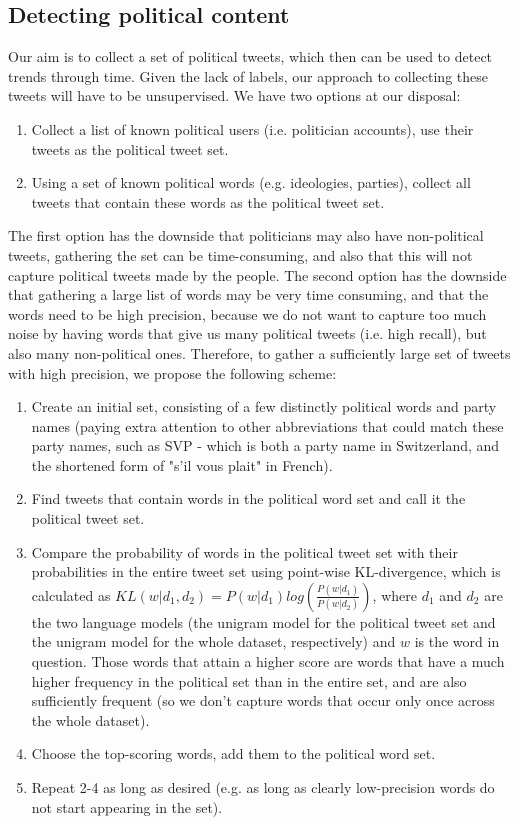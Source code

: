\subsection{Detecting political content}

Our aim is to collect a set of political tweets, which then can be used to detect trends through time. Given the lack of labels, our approach to collecting these tweets will have to be unsupervised. We have two options at our disposal:
\begin{enumerate}
  \item Collect a list of known political users (i.e. politician accounts), use their tweets as the political tweet set.
  \item Using a set of known political words (e.g. ideologies, parties), collect all tweets that contain these words as the political tweet set.
\end{enumerate}
The first option has the downside that politicians may also have non-political tweets, gathering the set can be time-consuming, and also that this will not capture political tweets made by the people. The second option has the downside that gathering a large list of words may be very time consuming, and that the words need to be high precision, because we do not 
want to capture too much noise by having words that give us many political tweets (i.e. high recall), but also many non-political ones. Therefore, to gather a sufficiently large set of tweets with high precision, we propose the following scheme:
\begin{enumerate}
  \item Create an initial set, consisting of a few distinctly political words and party names (paying extra attention to other abbreviations that could match these party names, such as SVP - which is both a party name in Switzerland, and the shortened form of "s'il vous plait" in French).
  \item Find tweets that contain words in the political word set and call it the political tweet set.
  \item Compare the probability of words in the political tweet set with their probabilities in the entire tweet set using point-wise KL-divergence, which is calculated as $ KL(w | d_{1}, d_{2}) = P(w | d_{1}) log(\frac{P(w | d_{1})}{P(w | d_{2})}) $, where $d_{1}$ and $d_{2}$ are the two language models (the unigram model for the political tweet set and the unigram model for the whole dataset, respectively) and $w$ is the word in question. Those words that attain a higher score are words that have a much higher frequency in the political set than in the entire set, and are also sufficiently frequent (so we don't capture words that occur only once across the whole dataset).
  \item Choose the top-scoring words, add them to the political word set.
  \item Repeat 2-4 as long as desired (e.g. as long as clearly low-precision words do not start appearing in the set).
\end{enumerate}
